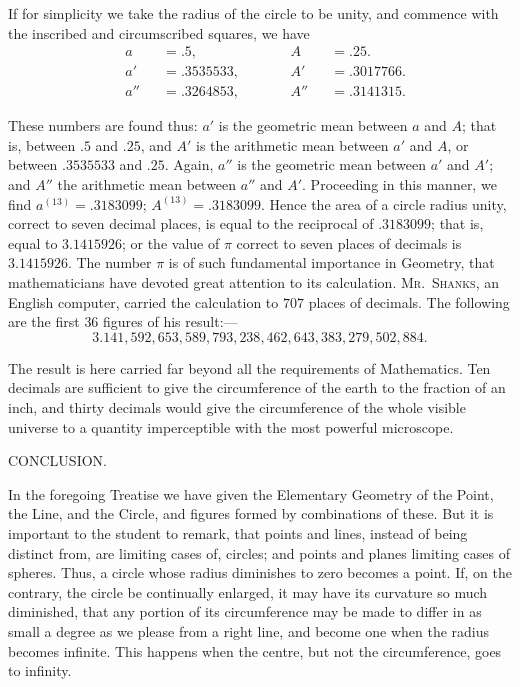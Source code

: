 \documentclass[oneside]{book}
\newcommand{\ibksp}{\hspace{-1.5em}}
\begin{document}
\begin{footnotesize}
If for simplicity we take the radius of the circle to be unity,
and commence with the inscribed and circumscribed squares, we
have
\[
\begin{alignedat}{4}
  &a   &&=.5,              &&A   &&=.25. \\
  &a'  &&=.3535533,\qquad  &&A'  &&=.3017766. \\
  &a'' &&=.3264853,        &&A'' &&=.3141315.
\end{alignedat}
\]

These numbers are found thus: $a'$ is the geometric mean between
$a$ and $A$; that is, between $.5$ and $.25$, and $A'$ is the arithmetic
mean between $a'$ and $A$, or between $.3535533$ and $.25$.
Again, $a''$ is the geometric mean between $a'$ and $A'$; and $A''$ the
arithmetic mean between $a''$ and $A'$. Proceeding in this manner,
we find $a^{(13)}=.3183099$; $A^{(13)} =.3183099$. Hence the area of a
circle radius unity, correct to seven decimal places, is equal to the
reciprocal of $.3183099$; that is, equal to $3.1415926$; or the value
of $\pi$ correct to seven places of decimals is $3.1415926$. The
number $\pi$ is of such fundamental importance in Geometry, that
mathematicians have devoted great attention to its calculation.
\textsc{Mr.\ Shanks}, an English computer, carried the calculation to
$707$ places of decimals. The following are the first $36$ figures
of his result:---
\[
3.141,592,653,589,793,238,462,643,383,279,502,884.
\]

The result is here carried far beyond all the requirements
of Mathematics. Ten decimals are sufficient to give the circumference
of the earth to the fraction of an inch, and thirty
decimals would give the circumference of the whole visible
universe to a quantity imperceptible with the most powerful
microscope.
\end{footnotesize}

\newpage
\addcontentsline{toc}{section}{\bigskip\ibksp Conclusion,}
\begin{center}
CONCLUSION.
\end{center}

In the foregoing Treatise we have given the
Elementary Geometry of the Point, the Line, and
the Circle, and figures formed by combinations of
these. But it is important to the student to remark,
that points and lines, instead of being distinct from,
are limiting cases of, circles; and points and planes
limiting cases of spheres. Thus, a circle whose
radius diminishes to zero becomes a point. If, on
the contrary, the circle be continually enlarged, it
may have its curvature so much diminished, that
any portion of its circumference may be made to
differ in as small a degree as we please from a right
line, and become one when the radius becomes infinite.
This happens when the centre, but not the
circumference, goes to infinity.
\end{document}
